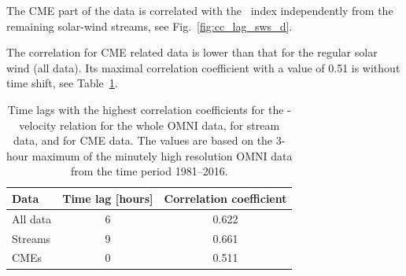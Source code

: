 The CME part of the data is correlated with the \Kp~index independently from the remaining solar-wind streams, see Fig.~\ref{fig:cc_lag_sws_d}.
\begin{figure}
\end{figure}
The correlation for CME related data is lower than that for the regular solar wind (all data). Its maximal correlation coefficient with a value of 0.51 is without time shift, see Table~\ref{tab:correlation_coefficients_kpvsv}.
\begin{table}
	\caption{Time lags with the highest correlation coefficients for the \Kp{}-velocity relation for the whole OMNI data, for stream data, and for CME data. The values are based on the 3-hour maximum of the minutely high resolution OMNI data from the time period 1981--2016.}
	\label{tab:correlation_coefficients_kpvsv}
	\centering
	\begin{tabular}{lcc}
		\hline\hline
		Data	&Time lag [hours]	&Correlation coefficient\\
		\hline
		All data	&6	&0.622\\
		Streams	&9	&0.661\\
		CMEs	&0	&0.511\\
		\hline
	\end{tabular}
\end{table}
% 
